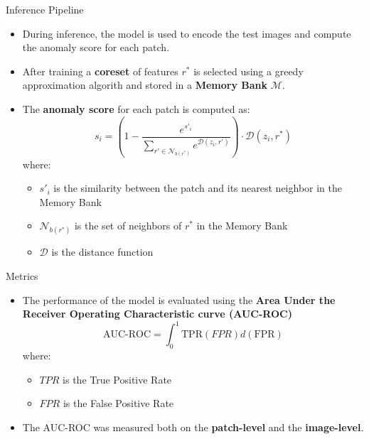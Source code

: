 \documentclass{beamer}
\begin{document}
\begin{frame}{Inference Pipeline}
      \begin{itemize}
              \item During inference, the model is used to encode the test images
               and compute the anomaly score for each patch.
              \item  After training a \textbf{coreset} of features $r^*$ is selected
              using a greedy approximation algorith and stored in 
              a \textbf{Memory Bank} $\mathcal{M}$.
                  \item The \textbf{anomaly score} for each patch is computed as:
                  \begin{equation}
                      s_i = (1- \frac{e^{s'_i}}{\sum_{r' \in \mathcal{N}_{b(r^*)}}e^{\mathcal{D}(z_i, r')}}) \cdot \mathcal{D}(z_i, r^*)
                  \end{equation}
                  where:
                  \begin{itemize}
                      \item $s'_i$ is the similarity between the patch and its nearest neighbor in the Memory Bank
                      \item $\mathcal{N}_{b(r^*)}$ is the set of neighbors of $r^*$ in the Memory Bank
                      \item $\mathcal{D}$ is the distance function
                      \end{itemize}
              \end{itemize}
\end{frame}
\begin{frame}{Metrics}
      \begin{itemize}
              \item The performance of the model is evaluated using the \textbf{Area Under the
               Receiver Operating Characteristic curve (AUC-ROC)} 
               \begin{equation}
                   \text{AUC-ROC} =  \int_{0}^{1} \text{TPR}(FPR)  d(\text{FPR})
                  \end{equation}
                  where:
                  \begin{itemize}
                      \item $TPR$ is the True Positive Rate
                      \item $FPR$ is the False Positive Rate
                      \end{itemize}
                  
                  \item The AUC-ROC was measured both on the \textbf{patch-level} and 
                  the \textbf{image-level}.
              \end{itemize}
\end{frame}
\end{document}
